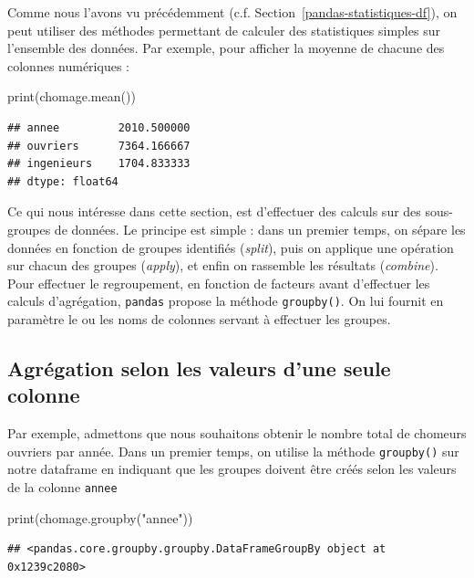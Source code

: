\documentclass[12pt,]{book}
\newenvironment{Shaded}{\begin{snugshade}}{\end{snugshade}}
\newcommand{\StringTok}[1]{\textcolor[rgb]{0.31,0.60,0.02}{#1}}
\newcommand{\BuiltInTok}[1]{#1}
\newcommand{\NormalTok}[1]{#1}
\numberwithin{equation}{section}
\numberwithin{countremarque}{section}
\begin{document}
Comme nous l'avons vu précédemment (c.f.
Section~\ref{pandas-statistiques-df}), on peut utiliser des méthodes
permettant de calculer des statistiques simples sur l'ensemble des
données. Par exemple, pour afficher la moyenne de chacune des colonnes
numériques :

\begin{Shaded}
\begin{Highlighting}[]
\BuiltInTok{print}\NormalTok{(chomage.mean())}
\end{Highlighting}
\end{Shaded}

\begin{lstlisting}
## annee         2010.500000
## ouvriers      7364.166667
## ingenieurs    1704.833333
## dtype: float64
\end{lstlisting}

Ce qui nous intéresse dans cette section, est d'effectuer des calculs
sur des sous-groupes de données. Le principe est simple : dans un
premier temps, on sépare les données en fonction de groupes identifiés
(\emph{split}), puis on applique une opération sur chacun des groupes
(\emph{apply}), et enfin on rassemble les résultats (\emph{combine}).
Pour effectuer le regroupement, en fonction de facteurs avant
d'effectuer les calculs d'agrégation, \texttt{pandas} propose la méthode
\texttt{groupby()}. On lui fournit en paramètre le ou les noms de
colonnes servant à effectuer les groupes.

\subsection{Agrégation selon les valeurs d'une seule
colonne}\label{agregation-selon-les-valeurs-dune-seule-colonne}

Par exemple, admettons que nous souhaitons obtenir le nombre total de
chomeurs ouvriers par année. Dans un premier temps, on utilise la
méthode \texttt{groupby()} sur notre dataframe en indiquant que les
groupes doivent être créés selon les valeurs de la colonne
\texttt{annee}

\begin{Shaded}
\begin{Highlighting}[]
\BuiltInTok{print}\NormalTok{(chomage.groupby(}\StringTok{"annee"}\NormalTok{))}
\end{Highlighting}
\end{Shaded}

\begin{lstlisting}
## <pandas.core.groupby.groupby.DataFrameGroupBy object at 0x1239c2080>
\end{lstlisting}
\end{document}

